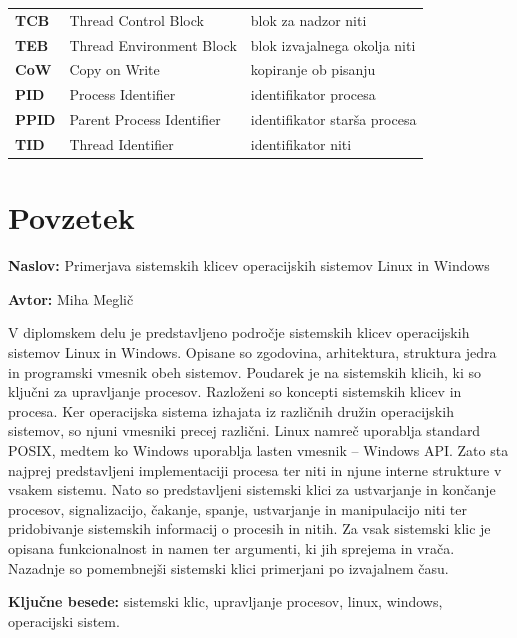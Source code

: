 \documentclass[a4paper,12pt,openright]{book}
\newcommand{\ttitle}{Primerjava sistemskih klicev operacijskih sistemov Linux in Windows}
\newcommand{\tauthor}{Miha Meglič}
\newcommand{\tkeywords}{sistemski klic, upravljanje procesov, linux, windows, operacijski sistem}
\newcommand{\clearemptydoublepage}{\newpage{\pagestyle{empty}\cleardoublepage}}
\begin{document}
\begin{tabular}{p{}|p{}|p{}}
{\bf TCB}     & Thread Control Block                & blok za nadzor niti                        \\
{\bf TEB}     & Thread Environment Block            & blok izvajalnega okolja niti               \\
{\bf CoW}     & Copy on Write                       & kopiranje ob pisanju                       \\
{\bf PID}     & Process Identifier                  & identifikator procesa                      \\
{\bf PPID}    & Parent Process Identifier           & identifikator starša procesa               \\
{\bf TID}     & Thread Identifier                   & identifikator niti                         \\
\end{tabular}


\clearemptydoublepage

\chapter*{Povzetek}

\noindent\textbf{Naslov:} \ttitle
\bigskip

\noindent\textbf{Avtor:} \tauthor
\bigskip

\noindent V diplomskem delu je predstavljeno področje sistemskih klicev operacijskih sistemov Linux in Windows.
Opisane so zgodovina, arhitektura, struktura jedra in programski vmesnik obeh sistemov.
Poudarek je na sistemskih klicih, ki so ključni za upravljanje procesov.
Razloženi so koncepti sistemskih klicev in procesa.
Ker operacijska sistema izhajata iz različnih družin operacijskih sistemov, so njuni vmesniki precej različni.
Linux namreč uporablja standard POSIX, medtem ko Windows uporablja lasten vmesnik -- Windows API.
Zato sta najprej predstavljeni implementaciji procesa ter niti in njune interne strukture v vsakem sistemu.
Nato so predstavljeni sistemski klici za ustvarjanje in končanje procesov, signalizacijo, čakanje, spanje, ustvarjanje in manipulacijo niti ter pridobivanje sistemskih informacij o procesih in nitih.
Za vsak sistemski klic je opisana funkcionalnost in namen ter argumenti, ki jih sprejema in vrača.
Nazadnje so pomembnejši sistemski klici primerjani po izvajalnem času.

\bigskip

\noindent\textbf{Ključne besede:} \tkeywords.
\clearemptydoublepage
\end{document}
